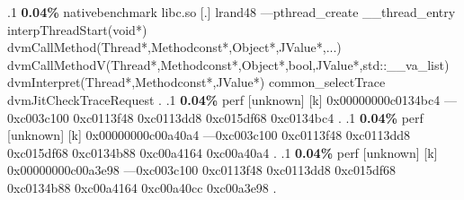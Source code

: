 \begin{profile}
{.1 \textbf{ 0.04\%} nativebenchmark  libc.so                [.] lrand48\newline {} ---pthread\_create\newline {} \_\_thread\_entry\newline {} interpThreadStart(void*)\newline {} dvmCallMethod(Thread*,Methodconst*,Object*,JValue*,...)\newline {} dvmCallMethodV(Thread*,Methodconst*,Object*,bool,JValue*,std::\_\_va\_list)\newline {} dvmInterpret(Thread*,Methodconst*,JValue*)\newline {} common\_selectTrace\newline {} dvmJitCheckTraceRequest\newline {} . 
.1 \textbf{ 0.04\%} perf             [unknown]              [k] 0x00000000c0134bc4\newline {} ---0xc003c100\newline {} 0xc0113f48\newline {} 0xc0113dd8\newline {} 0xc015df68\newline {} 0xc0134bc4\newline {} . 
.1 \textbf{ 0.04\%} perf             [unknown]              [k] 0x00000000c00a40a4\newline {} ---0xc003c100\newline {} 0xc0113f48\newline {} 0xc0113dd8\newline {} 0xc015df68\newline {} 0xc0134b88\newline {} 0xc00a4164\newline {} 0xc00a40a4\newline {} . 
.1 \textbf{ 0.04\%} perf             [unknown]              [k] 0x00000000c00a3e98\newline {} ---0xc003c100\newline {} 0xc0113f48\newline {} 0xc0113dd8\newline {} 0xc015df68\newline {} 0xc0134b88\newline {} 0xc00a4164\newline {} 0xc00a40cc\newline {} 0xc00a3e98\newline {} . 
}
\end{profile}
